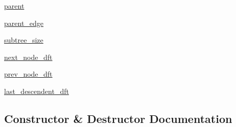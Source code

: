 \begin{DoxyCompactItemize}
\item 
\hyperlink{classnetworkx_1_1algorithms_1_1flow_1_1networksimplex_1_1__DataEssentialsAndFunctions_ab2b3b9f8eb02d1352565363e62f3ecab}{parent}
\item 
\hyperlink{classnetworkx_1_1algorithms_1_1flow_1_1networksimplex_1_1__DataEssentialsAndFunctions_ad6336f27cc6f7d73035f99c5068718a3}{parent\+\_\+edge}
\item 
\hyperlink{classnetworkx_1_1algorithms_1_1flow_1_1networksimplex_1_1__DataEssentialsAndFunctions_a6485240e4d84d4dae5296f2386145fb8}{subtree\+\_\+size}
\item 
\hyperlink{classnetworkx_1_1algorithms_1_1flow_1_1networksimplex_1_1__DataEssentialsAndFunctions_ac5b87916a494c61737d1d2b45402d4b4}{next\+\_\+node\+\_\+dft}
\item 
\hyperlink{classnetworkx_1_1algorithms_1_1flow_1_1networksimplex_1_1__DataEssentialsAndFunctions_a5eed07f58db15e1525a5948ad9efaa30}{prev\+\_\+node\+\_\+dft}
\item 
\hyperlink{classnetworkx_1_1algorithms_1_1flow_1_1networksimplex_1_1__DataEssentialsAndFunctions_ad03b016cd657336a18ea56442ad37f10}{last\+\_\+descendent\+\_\+dft}
\end{DoxyCompactItemize}


\subsection{Constructor \& Destructor Documentation}
\mbox{\label{classnetworkx_1_1algorithms_1_1flow_1_1networksimplex_1_1__DataEssentialsAndFunctions_ad525aa83bcf57f66e793ac670b3bbb35}} 
